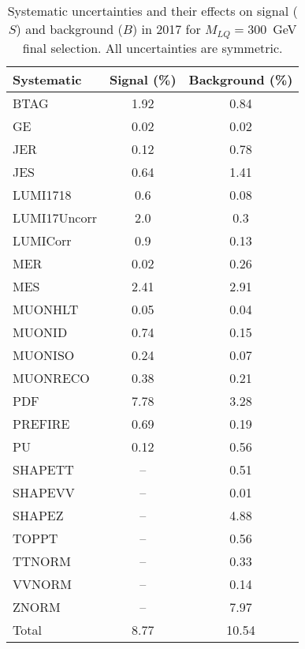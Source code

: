 \begin{table}[htbp]
\begin{center}
\caption{Systematic uncertainties and their effects on signal ($S$) and background ($B$) in 2017 for $M_{LQ}=300$~GeV final selection. All uncertainties are symmetric.}
\begin{tabular}{lcc}
\hline\hline
Systematic & Signal (\%) & Background (\%) \\ \hline 
BTAG & 1.92 & 0.84\\ 
GE & 0.02 & 0.02\\ 
JER & 0.12 & 0.78\\ 
JES & 0.64 & 1.41\\ 
LUMI1718 & 0.6 & 0.08\\ 
LUMI17Uncorr & 2.0 & 0.3\\ 
LUMICorr & 0.9 & 0.13\\ 
MER & 0.02 & 0.26\\ 
MES & 2.41 & 2.91\\ 
MUONHLT & 0.05 & 0.04\\ 
MUONID & 0.74 & 0.15\\ 
MUONISO & 0.24 & 0.07\\ 
MUONRECO & 0.38 & 0.21\\ 
PDF & 7.78 & 3.28\\ 
PREFIRE & 0.69 & 0.19\\ 
PU & 0.12 & 0.56\\ 
SHAPETT & -- & 0.51\\ 
SHAPEVV & -- & 0.01\\ 
SHAPEZ & -- & 4.88\\ 
TOPPT & -- & 0.56\\ 
TTNORM & -- & 0.33\\ 
VVNORM & -- & 0.14\\ 
ZNORM & -- & 7.97\\ 
Total & 8.77 & 10.54\\ \hline \hline
\end{tabular}
\label{tab:SysUncertainties_uujj_300}
\end{center}
\end{table}

